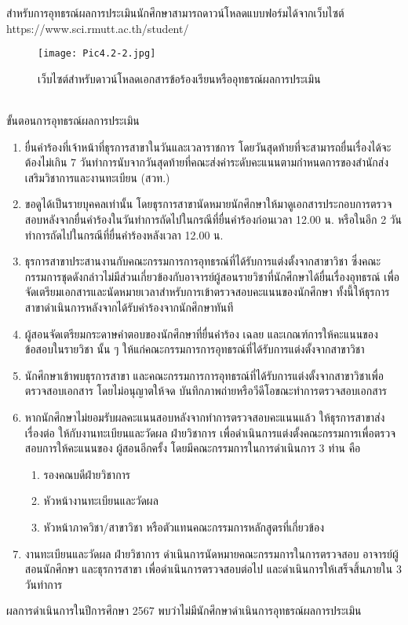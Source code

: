 สำหรับการอุทธรณ์ผลการประเมินนักศึกษาสามารถดาวน์โหลดแบบฟอร์มได้จากเว็บไซต์\\ https://www.sci.rmutt.ac.th/student/ \\
\begin{figure}[h!]
		\texttt{[image: Pic4.2-2.jpg]}
		\caption{เว็บไซต์สำหรับดาวน์โหลดเอกสารข้อร้องเรียนหรืออุทธรณ์ผลการประเมิน}
\end{figure}
\\
\noindent
\newpage
ขั้นตอนการอุทธรณ์ผลการประเมิน
\begin{enumerate}
\item ยื่นคำร้องที่เจ้าหน้าที่ธุรการสาขาในวันและเวลาราชการ โดยวันสุดท้ายที่จะสามารถยื่นเรื่องได้จะต้องไม่เกิน 7 วันทำการนับจากวันสุดท้ายที่คณะส่งค่าระดับคะแนนตามกำหนดการของสำนักส่งเสริมวิชาการและงานทะเบียน (สวท.)
\item ขอดูได้เป็นรายบุคคลเท่านั้น โดยธุรการสาขานัดหมายนักศึกษาให้มาดูเอกสารประกอบการตรวจสอบหลังจากยื่นคำร้องในวันทำการถัดไปในกรณีที่ยื่นคำร้องก่อนเวลา 12.00 น. หรือในอีก 2 วันทำการถัดไปในกรณีที่ยื่นคำร้องหลังเวลา 12.00 น.
\item ธุรการสาขาประสานงานกับคณะกรรมการการอุทธรณ์ที่ได้รับการแต่งตั้งจากสาขาวิชา ซึ่งคณะกรรมการชุดดังกล่าวไม่มีส่วนเกี่ยวข้องกับอาจารย์ผู้สอนรายวิชาที่นักศึกษาได้ยื่นเรื่องอุทธรณ์ เพื่อจัดเตรียมเอกสารและนัดหมายเวลาสำหรับการเข้าตรวจสอบคะแนนของนักศึกษา ทั้งนี้ให้ธุรการสาขาดำเนินการหลังจากได้รับคำร้องจากนักศึกษาทันที
\item ผู้สอนจัดเตรียมกระดาษคำตอบของนักศึกษาที่ยื่นคำร้อง เฉลย และเกณฑ์การให้คะแนนของข้อสอบในรายวิชา
นั้น ๆ ให้แก่คณะกรรมการการอุทธรณ์ที่ได้รับการแต่งตั้งจากสาขาวิชา
\item นักศึกษาเข้าพบธุรการสาขา และคณะกรรมการการอุทธรณ์ที่ได้รับการแต่งตั้งจากสาขาวิชาเพื่อตรวจสอบเอกสาร โดยไม่อนุญาตให้จด บันทึกภาพถ่ายหรือวีดีโอขณะทำการตรวจสอบเอกสาร
\item หากนักศึกษาไม่ยอมรับผลคะแนนสอบหลังจากทำการตรวจสอบคะแนนแล้ว ให้ธุรการสาขาส่งเรื่องต่อ
ให้กับงานทะเบียนและวัดผล ฝ่ายวิชาการ เพื่อดำเนินการแต่งตั้งคณะกรรมการเพื่อตรวจสอบการให้คะแนนของ
ผู้สอนอีกครั้ง โดยมีคณะกรรมการในการดำเนินการ 3 ท่าน คือ
\begin{enumerate}[label=\arabic*),leftmargin=1cm]
\item รองคณบดีฝ่ายวิชาการ 
\item หัวหน้างานทะเบียนและวัดผล
\item หัวหน้าภาควิชา/สาขาวิชา หรือตัวแทนคณะกรรมการหลักสูตรที่เกี่ยวข้อง
\end{enumerate}
\item งานทะเบียนและวัดผล ฝ่ายวิชาการ ดำเนินการนัดหมายคณะกรรมการในการตรวจสอบ อาจารย์ผู้สอนนักศึกษา และธุรการสาขา เพื่อดำเนินการตรวจสอบต่อไป และดำเนินการให้เสร็จสิ้นภายใน 3 วันทำการ
\end{enumerate}
ผลการดำเนินการในปีการศึกษา 2567 พบว่าไม่มีนักศึกษาดำเนินการอุทธรณ์ผลการประเมิน 


